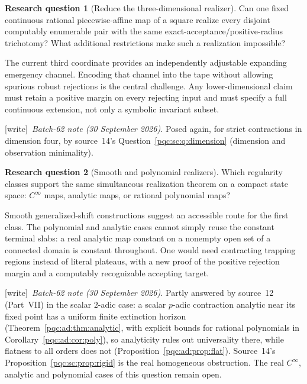 \documentclass[11pt,letterpaper]{article}
\numberwithin{equation}{section}
\theoremstyle{definition}
\newtheorem{question}{Research question}
\theoremstyle{remark}
\newcommand{\wtag}{\textup{[write]}}
\newcommand{\cenum}{computably enumerable}
\newcommand{\PWA}{piecewise-affine}
\begin{document}
\begin{question}[Reduce the three-dimensional realizer]\label{pqc:cb:q:dimension}
Can one fixed continuous rational \PWA{} map of a square realize every
disjoint \cenum{} pair with the same exact-acceptance/positive-radius trichotomy?
What additional restrictions make such a realization impossible?
\end{question}
The current third coordinate provides an independently adjustable expanding
emergency channel.  Encoding that channel into the tape without allowing
spurious robust rejections is the central challenge.  Any lower-dimensional
claim must retain a positive margin on every rejecting input and must specify
a full continuous extension, not only a symbolic invariant subset.
\par\noindent\wtag\ \emph{Batch-62 note (30 September 2026).} Posed again, for strict contractions in dimension four, by source~14's
Question~\ref{pqc:sc:q:dimension} (dimension and observation minimality).

\begin{question}[Smooth and polynomial realizers]\label{pqc:cb:q:realizers}
Which regularity classes support the same simultaneous realization theorem
on a compact state space: $C^\infty$ maps, analytic maps, or rational polynomial
maps?
\end{question}
Smooth generalized-shift constructions suggest an accessible route for the
first class.  The polynomial and analytic cases cannot simply reuse the
constant terminal slabs: a real analytic map constant on a nonempty open set
of a connected domain is constant throughout.  One would need contracting
trapping regions instead of literal plateaus, with a new proof of the
positive rejection margin and a computably recognizable accepting target.
\par\noindent\wtag\ \emph{Batch-62 note (30 September 2026).} Partly answered by source~12 (Part~VII) in the scalar $2$-adic case: a
scalar $p$-adic contraction analytic near its fixed point has a uniform finite
extinction horizon (Theorem~\ref{pqc:ad:thm:analytic}, with explicit bounds for
rational polynomials in Corollary~\ref{pqc:ad:cor:poly}), so analyticity rules
out universality there, while flatness to all orders does not
(Proposition~\ref{pqc:ad:prop:flat}). Source~14's
Proposition~\ref{pqc:sc:prop:rigid} is the real homogeneous obstruction. The
real $C^\infty$, analytic and polynomial cases of this question remain open.
\end{document}
